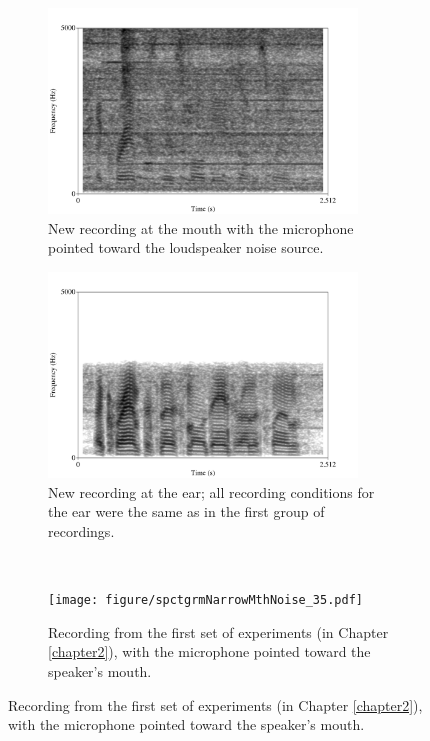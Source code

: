 \begin{figure}[h!]
\begin{subfigure}{0.45\textwidth}
  \centering
  \includegraphics[width=0.9\textwidth]{figure/spectNewMouthNoise.png}
  \caption{New recording at the mouth with the microphone pointed toward the loudspeaker noise source.}
  \label{fig:spectNewMouthNoise}
\end{subfigure}
\qquad
\begin{subfigure}{0.45\textwidth}
  \centering
  \includegraphics[width=0.9\textwidth]{figure/spectNewEarNoise.png}
  \caption{New recording at the ear; all recording conditions for the ear were the same as in the first group of recordings.}
  \label{fig:spectNewEarNoise}
\end{subfigure}
\\[2ex]
\begin{subfigure}{0.45\textwidth}
  \centering
  \texttt{[image: figure/spctgrmNarrowMthNoise\_35.pdf]}
  \caption{Recording from the first set of experiments (in Chapter \ref{chapter2}), with the microphone pointed toward the speaker's mouth.}

\end{subfigure}
\end{figure}
